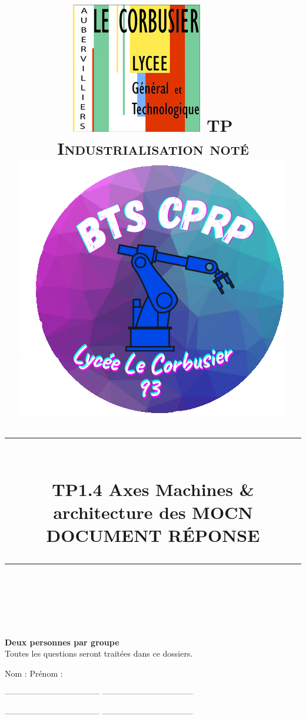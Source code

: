 \documentclass[12pt]{article}
\newcommand{\HRule}[1]{\rule{\linewidth}{#1}}
\begin{document}
 
\title{ \includegraphics[width=0.18\linewidth]{corbu.jpg} \hspace{2cm} \normalsize \textsc{TP Industrialisation noté \hspace{2cm} \includegraphics[width=0.2\linewidth]{btscprp.png}}
		\\ [2.0cm]
		\HRule{0.5pt} \\
		\LARGE TP1.4 Axes Machines \& architecture des MOCN \\ \textbf{DOCUMENT RÉPONSE}
		\HRule{2pt} \\ [0.5cm]}
\maketitle

\textbf{Deux personnes par groupe}\\ Toutes les questions seront traitées dans ce dossiers.


Nom :  \hspace{5cm} Prénom : \\


\vspace{1cm}

-----------------------------------  \hspace{1cm}   ---------------------------------

\vspace{1cm}

-----------------------------------  \hspace{1cm}   ---------------------------------




\sectionfont{\scshape}




\newpage



\end{document}
